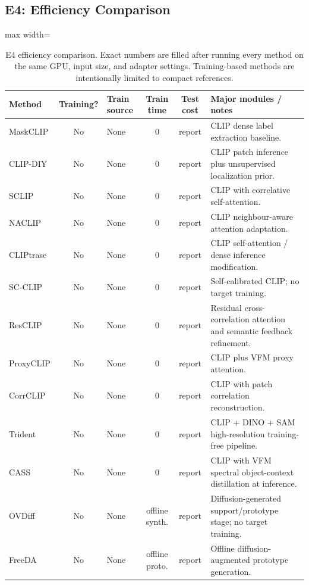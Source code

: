 \documentclass[11pt,a4paper]{article}
\begin{document}
\subsection{E4: Efficiency Comparison}

\begin{table}[H]
\centering
\scriptsize
\caption{E4 efficiency comparison. Exact numbers are filled after running every method on the same GPU, input size, and adapter settings. Training-based methods are intentionally limited to compact references.}
\label{tab:e4-efficiency}
\setlength{\tabcolsep}{3pt}
\begin{adjustbox}{max width=\textwidth}
\begin{tabular}{l c p{} c c p{}}
\toprule
Method & Training? & Train source & Train time & Test cost & Major modules / notes \\
\midrule
MaskCLIP & No & None & 0 & report & CLIP dense label extraction baseline. \\
CLIP-DIY & No & None & 0 & report & CLIP patch inference plus unsupervised localization prior. \\
SCLIP & No & None & 0 & report & CLIP with correlative self-attention. \\
NACLIP & No & None & 0 & report & CLIP neighbour-aware attention adaptation. \\
CLIPtrase & No & None & 0 & report & CLIP self-attention / dense inference modification. \\
SC-CLIP & No & None & 0 & report & Self-calibrated CLIP; no target training. \\
ResCLIP & No & None & 0 & report & Residual cross-correlation attention and semantic feedback refinement. \\
ProxyCLIP & No & None & 0 & report & CLIP plus VFM proxy attention. \\
CorrCLIP & No & None & 0 & report & CLIP with patch correlation reconstruction. \\
Trident & No & None & 0 & report & CLIP + DINO + SAM high-resolution training-free pipeline. \\
CASS & No & None & 0 & report & CLIP with VFM spectral object-context distillation at inference. \\
OVDiff & No & None & offline synth. & report & Diffusion-generated support/prototype stage; no target training. \\
FreeDA & No & None & offline proto. & report & Offline diffusion-augmented prototype generation. \\

\end{tabular}
\end{adjustbox}
\end{table}
\end{document}
